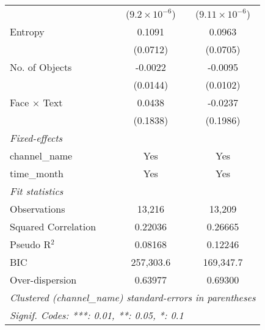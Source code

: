 \begin{table}[htbp]
\begin{tabular}{lcc}
                           & ($9.2\times 10^{-6}$)   & ($9.11\times 10^{-6}$)\\    
      Entropy              & 0.1091                  & 0.0963\\   
                           & (0.0712)                & (0.0705)\\   
      No. of Objects       & -0.0022                 & -0.0095\\   
                           & (0.0144)                & (0.0102)\\   
      Face × Text          & 0.0438                  & -0.0237\\   
                           & (0.1838)                & (0.1986)\\   
      \midrule
      \emph{Fixed-effects}\\
      channel\_name        & Yes                     & Yes\\  
      time\_month          & Yes                     & Yes\\  
      \midrule
      \emph{Fit statistics}\\
      Observations         & 13,216                  & 13,209\\  
      Squared Correlation  & 0.22036                 & 0.26665\\  
      Pseudo R$^2$         & 0.08168                 & 0.12246\\  
      BIC                  & 257,303.6               & 169,347.7\\  
      Over-dispersion      & 0.63977                 & 0.69300\\  
      \midrule \midrule
      \multicolumn{3}{l}{\emph{Clustered (channel\_name) standard-errors in parentheses}}\\
      \multicolumn{3}{l}{\emph{Signif. Codes: ***: 0.01, **: 0.05, *: 0.1}}\\
   \end{tabular}
\end{table}



